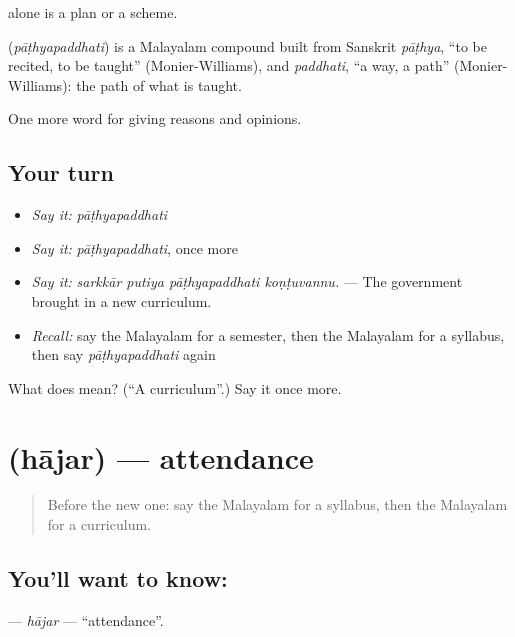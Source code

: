  alone is a plan or a scheme.

\begin{cousinweb}
\textbf{} (\emph{pāṭhyapaddhati}) is a Malayalam compound built from Sanskrit \emph{pāṭhya}, \textquotedblleft{}to be recited, to be taught\textquotedblright{} (Monier-Williams), and \emph{paddhati}, \textquotedblleft{}a way, a path\textquotedblright{} (Monier-Williams): the path of what is taught.
\end{cousinweb}

\begin{grammarlens}[title={What you've built}]
One more word for giving reasons and opinions.
\end{grammarlens}

\subsection*{Your turn}
\begin{itemize}
\raggedright
  \item \emph{Say it:} \emph{pāṭhyapaddhati}
  \item \emph{Say it:} \emph{pāṭhyapaddhati}, once more
  \item \emph{Say it:} \emph{sarkkār putiya pāṭhyapaddhati koṇṭuvannu.} — The government brought in a new curriculum.
  \item \emph{Recall:} say the Malayalam for a semester, then the Malayalam for a syllabus, then say \emph{pāṭhyapaddhati} again
\end{itemize}

\begin{tcolorbox}[breakable,colback=teal!4,colframe=teal!35!black,title={Before you move on}]
What does  mean? (\textquotedblleft{}A curriculum\textquotedblright{}.) Say it once more.
\end{tcolorbox}
\section[\texorpdfstring{\ml{ഹാജർ} (hājar)}{ഹാജർ (hājar)}]{ (hājar) — attendance}

\label{lesson:ML-C434-hajar}



\begin{quote}
Before the new one: say the Malayalam for a syllabus, then the Malayalam for a curriculum.
\end{quote}

\subsection*{You'll want to know: }
\textbf{} — \emph{hājar} — \textquotedblleft{}attendance\textquotedblright{}.


